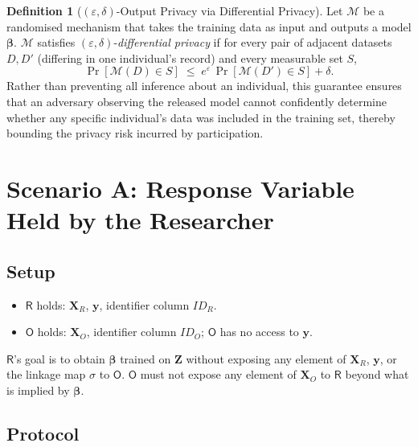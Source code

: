 \documentclass[12pt]{article}
\theoremstyle{definition}
\newtheorem{definition}{Definition}[section]
\theoremstyle{plain}
\newcommand{\bXR}{\mathbf{X}_{R}}
\newcommand{\bXO}{\mathbf{X}_{O}}
\newcommand{\bZ}{\mathbf{Z}}
\newcommand{\by}{\mathbf{y}}
\newcommand{\bbeta}{\boldsymbol{\beta}}
\newcommand{\Party}[1]{\textsf{#1}}
\begin{document}
\begin{definition}[$(\varepsilon,\delta)$-Output Privacy via Differential Privacy]
Let $\mathcal{M}$ be a randomised mechanism that takes the training data as input and outputs a model $\bbeta$. $\mathcal{M}$ satisfies $(\varepsilon,\delta)$-\emph{differential privacy} if for every pair of adjacent datasets $D, D'$ (differing in one individual's record) and every measurable set $S$,
\[
  \Pr[\mathcal{M}(D) \in S] \;\leq\; e^{\varepsilon}\,\Pr[\mathcal{M}(D') \in S] + \delta.
\]
Rather than preventing all inference about an individual, this guarantee ensures that an adversary observing the released model cannot confidently determine whether any specific individual's data was included in the training set, thereby bounding the privacy risk incurred by participation.
\end{definition}

\section{Scenario A: Response Variable Held by the Researcher}
\label{sec:scenA}

\subsection{Setup}

\begin{itemize}[noitemsep]
  \item $\Party{R}$ holds: $\bXR$, $\by$, identifier column $\mathit{ID}_{R}$.
  \item $\Party{O}$ holds: $\bXO$, identifier column $\mathit{ID}_{O}$; $\Party{O}$ has no access to $\by$.
\end{itemize}

$\Party{R}$'s goal is to obtain $\bbeta$ trained on $\bZ$ without exposing any element of $\bXR$, $\by$, or the linkage map $\sigma$ to $\Party{O}$. $\Party{O}$ must not expose any element of $\bXO$ to $\Party{R}$ beyond what is implied by $\bbeta$.

\subsection{Protocol}
\end{document}

